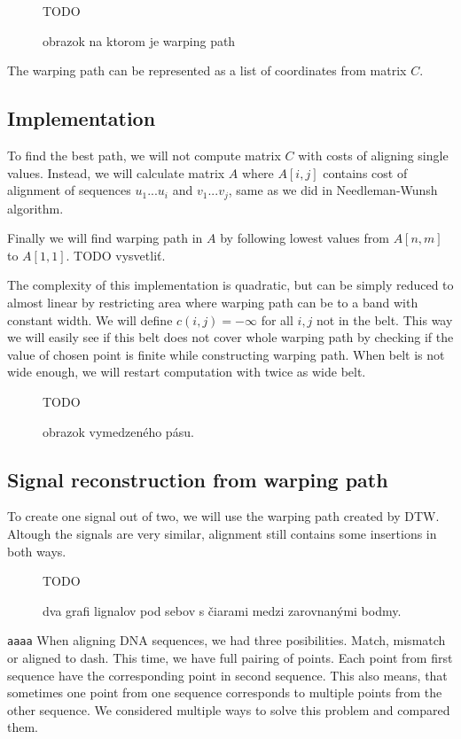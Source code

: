 \begin{figure}
  \centering
  TODO
  \caption{obrazok na ktorom je warping path}
\end{figure}

The warping path can be represented as a list of coordinates from matrix $C$.


\subsection{Implementation}
To find the best path, we will not compute matrix $C$ with costs of aligning single values.
Instead, we will calculate matrix $A$ where $A[i,j]$ contains cost of alignment of sequences $u_1...u_i$ and $v_1...v_j$, 
same as we did in Needleman-Wunsh algorithm. 



Finally we will find warping path in $A$ by following lowest values from $A[n,m]$ to $A[1,1]$. 
TODO vysvetliť.

The complexity of this implementation is quadratic, but can be simply reduced to almost linear by restricting area where warping path can be to a band with constant width. We will define $c(i,j)=-\infty$ for all $i,j$ not in the belt. This way we will easily see if this belt does not cover whole warping path by checking if the value of chosen point is finite while constructing warping path. 
When belt is not wide enough, we will restart computation with twice as wide belt.
\begin{figure}
  \centering
  TODO
  \caption{obrazok vymedzeného pásu.}
\end{figure}


\subsection{Signal reconstruction from warping path}
To create one signal out of two, we will use the warping path created by DTW.
Altough the signals are very similar, alignment still contains some insertions in both ways. 
\begin{figure}
  \centering
  TODO
  \caption{dva grafi lignalov pod sebov s čiarami medzi zarovnanými bodmy.}
\end{figure}
\texttt{aaaa}
When aligning DNA sequences, we had three posibilities. Match, mismatch or aligned to dash. 
This time, we have full pairing of points. Each point from first sequence have the corresponding point
in second sequence. This also means, that sometimes one point from one sequence corresponds to multiple 
points from the other sequence.
We considered multiple ways to solve this problem and compared them.

